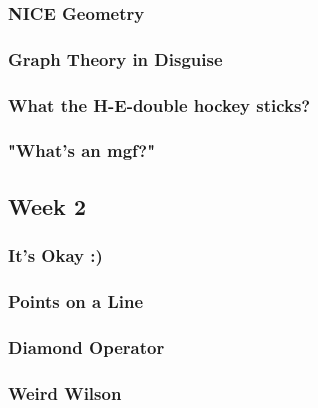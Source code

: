 \documentclass[titlepage=true]{scrartcl}
\begin{document}
    \subsubsection{NICE Geometry}
	\label{13.1.4}
	
	\newpage

    \subsubsection{Graph Theory in Disguise}
	\label{13.1.5}
	
	\newpage

    \subsubsection{What the H-E-double hockey sticks?}
	\label{13.1.6}
	
	\newpage

    \subsubsection{"What's an mgf?"}
	\label{13.1.7}
	
	\newpage

\subsection{Week 2}

    \subsubsection{It's Okay :)}
    \label{13.2.1}
    
    \newpage

    \subsubsection{Points on a Line}
	\label{13.2.2}
	
	\newpage

    \subsubsection{Diamond Operator}
	\label{13.2.3}
	
	\newpage
    
    \subsubsection{Weird Wilson}
	\label{13.2.4}
	
	\newpage
\end{document}
